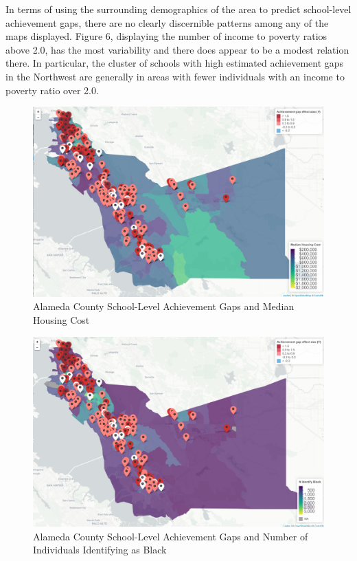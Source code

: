 \documentclass[man, fleqn, noextraspace]{apa6}
\theoremstyle{definition}
\theoremstyle{definition}
\theoremstyle{definition}
\theoremstyle{remark}
\begin{document}
In terms of using the surrounding demographics of the area to predict
school-level achievement gaps, there are no clearly discernible patterns
among any of the maps displayed. Figure 6, displaying the number of
income to poverty ratios above 2.0, has the most variability and there
does appear to be a modest relation there. In particular, the cluster of
schools with high estimated achievement gaps in the Northwest are
generally in areas with fewer individuals with an income to poverty
ratio over 2.0.

\begin{figure}
\centering
\includegraphics{anderson_ncme18_files/screen_caps/median_house.png}
\caption{Alameda County School-Level Achievement Gaps and Median Housing
Cost}
\end{figure}

\begin{figure}
\centering
\includegraphics{anderson_ncme18_files/screen_caps/n_black.png}
\caption{Alameda County School-Level Achievement Gaps and Number of
Individuals Identifying as Black}
\end{figure}
\end{document}
